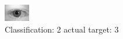 \begin{figure}[h!]
\begin{center}
\includegraphics[width=0.60\columnwidth]{figures/ID605_class_2_target_3.png}
\end{center}
\caption{ Classification: 2 actual target: 3}
\label{fig:ID605_class_2_target_3}
\end{figure}
